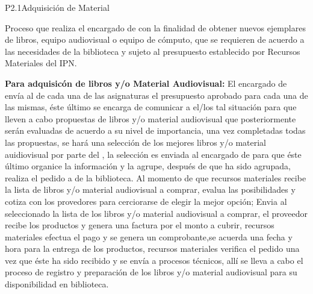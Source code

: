 
\begin{Proceso}{P2.1}{Adquisición de Material} {
  
Proceso que realiza el encargado de  con la finalidad de obtener nuevos ejemplares de libros, equipo audiovisual o equipo de cómputo, que se requieren de acuerdo a las necesidades  de la biblioteca y sujeto al presupuesto establecido por Recursos Materiales del IPN.\vspace{5mm}
  
\textbf{Para adquisicón de libros y/o Material Audiovisual:} El encargado de  envía al  de cada una de las asignaturas el presupuesto aprobado para cada una de las mismas, éste último se encarga de comunicar a el/los  tal situación para que lleven a cabo propuestas de libros y/o material audiovisual que posteriormente serán evaluadas de acuerdo a su nivel de importancia, una vez completadas todas las propuestas, se hará una selección de los mejores libros y/o material auidiovisual por parte del , la selección es enviada al encargado de  para que éste último organice la información y la agrupe, después de que ha sido agrupada, realiza el pedido a  de la biblioteca. Al momento de que recursos materiales recibe la lista de libros y/o material audiovisual a comprar, evalua las posibilidades y cotiza con los provedores para cerciorarse de elegir la mejor opción; Envia al  seleccionado la lista de los libros y/o material audiovisual a comprar, el proveedor recibe los productos y genera una factura por el monto a cubrir, recursos materiales efectua el pago y se genera un comprobante,se acuerda una fecha y hora para la entrega de los productos, recursos materiales verifica el pedido una vez que éste ha sido recibido y se envía a procesos técnicos, allí se lleva a cabo el proceso de registro y preparación de los libros y/o material audiovisual para su disponibilidad en biblioteca.
\vspace{5mm}

}
\end{Proceso}
